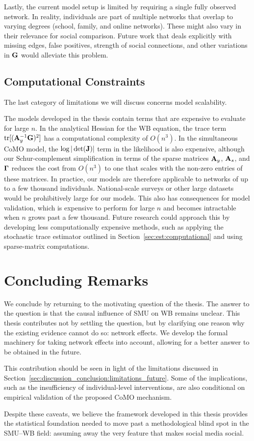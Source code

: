Lastly, the current model setup is limited by requiring a single fully observed network. In reality, individuals are part of multiple networks that overlap to varying degrees (school, family, and online networks). These might also vary in their relevance for social comparison. Future work that deals explicitly with missing edges, false positives, strength of social connections, and other variations in $\mathbf{G}$ would alleviate this problem.

\subsection{Computational Constraints}

The last category of limitations we will discuss concerns model scalability.

The models developed in the thesis contain terms that are expensive to evaluate for large $n$. In the analytical Hessian for the WB equation, the trace term $\operatorname{tr}[(\mathbf{A}_y^{-1}\mathbf{G})^2]$ has a computational complexity of $O(n^3)$. In the simultaneous CoMO model, the $\log|\det(\mathbf{J})|$ term in the likelihood is also expensive, although our Schur-complement simplification in terms of the sparse matrices $\mathbf{A}_y$, $\mathbf{A}_s$, and $\mathbf{\Gamma}$ reduces the cost from $O(n^3)$ to one that scales with the non-zero entries of these matrices. In practice, our models are therefore applicable to networks of up to a few thousand individuals. National-scale surveys or other large datasets would be prohibitively large for our models. This also has consequences for model validation, which is expensive to perform for large $n$ and becomes intractable when $n$ grows past a few thousand. Future research could approach this by developing less computationally expensive methods, such as applying the stochastic trace estimator outlined in Section~\ref{sec:est:computational} and using sparse-matrix computations.

\section{Concluding Remarks}
\label{sec:discussion_conclusion:closing}
We conclude by returning to the motivating question of the thesis. The answer to the question is that the causal influence of SMU on WB remains unclear. This thesis contributes not by settling the question, but by clarifying one reason why the existing evidence cannot do so: network effects. We develop the formal machinery for taking network effects into account, allowing for a better answer to be obtained in the future.

This contribution should be seen in light of the limitations discussed in Section~\ref{sec:discussion_conclusion:limitations_future}. Some of the implications, such as the insufficiency of individual-level interventions, are also conditional on empirical validation of the proposed CoMO mechanism.

Despite these caveats, we believe the framework developed in this thesis provides the statistical foundation needed to move past a methodological blind spot in the SMU--WB field: assuming away the very feature that makes social media social.
